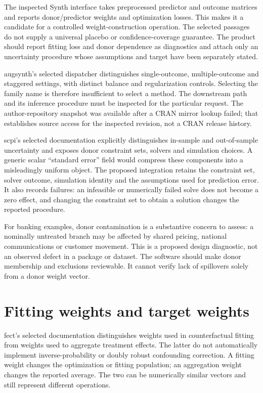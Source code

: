 The inspected Synth interface takes preprocessed predictor and outcome
matrices and reports donor/predictor weights and optimization losses. This
makes it a candidate for a controlled weight-construction operation. The
selected passages do not supply a universal placebo or confidence-coverage
guarantee. The product should report fitting loss and donor dependence as
diagnostics and attach only an uncertainty procedure whose assumptions and
target have been separately stated.\cite{v12_sw_synth}

augsynth's selected dispatcher distinguishes single-outcome, multiple-outcome
and staggered settings, with distinct balance and regularization controls.
Selecting the family name is therefore insufficient to select a method.
The downstream path and its inference procedure must be inspected for the
particular request. The author-repository snapshot was available after a CRAN
mirror lookup failed; that establishes source access for the inspected
revision, not a CRAN release history.\cite{v12_sw_augsynth}

scpi's selected documentation explicitly distinguishes in-sample and
out-of-sample uncertainty and exposes donor constraint sets, solvers and
simulation choices. A generic scalar ``standard error'' field would compress
these components into a misleadingly uniform object. The proposed integration
retains the constraint set, solver outcome, simulation identity and the
assumptions used for prediction error. It also records failures: an infeasible
or numerically failed solve does not become a zero effect, and changing the
constraint set to obtain a solution changes the reported procedure.
\cite{v12_sw_scpi}

For banking examples, donor contamination is a substantive concern to assess:
a nominally untreated branch may be affected by shared pricing, national
communications or customer movement. This is a proposed design diagnostic,
not an observed defect in a package or dataset. The software should make donor
membership and exclusions reviewable. It cannot verify lack of spillovers
solely from a donor weight vector.

\section{Fitting weights and target weights}

fect's selected documentation distinguishes weights used in counterfactual
fitting from weights used to aggregate treatment effects. The latter do not
automatically implement inverse-probability or doubly robust confounding
correction. A fitting weight changes the optimization or fitting population;
an aggregation weight changes the reported average. The two can be numerically
similar vectors and still represent different operations.\cite{v12_sw_fect}

